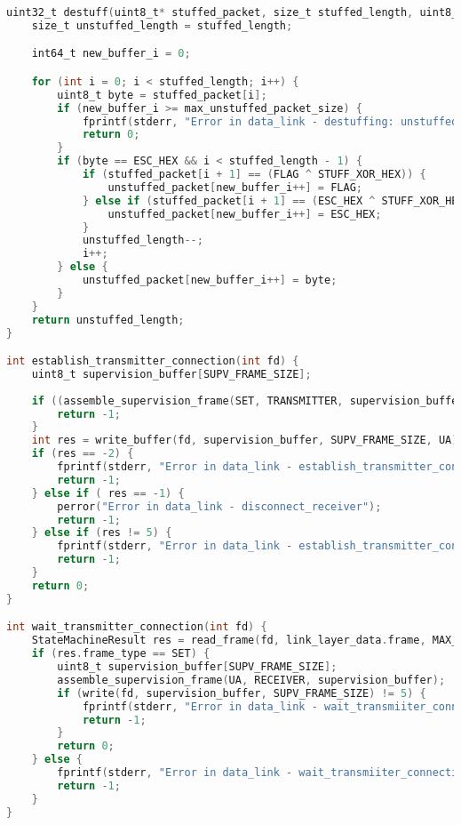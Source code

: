 \begin{lstlisting}[language=C, caption=data_link.c]
uint32_t destuff(uint8_t* stuffed_packet, size_t stuffed_length, uint8_t* unstuffed_packet, size_t max_unstuffed_packet_size) {
    size_t unstuffed_length = stuffed_length;

    int64_t new_buffer_i = 0;

    for (int i = 0; i < stuffed_length; i++) {
        uint8_t byte = stuffed_packet[i];
        if (new_buffer_i >= max_unstuffed_packet_size) {
            fprintf(stderr, "Error in data_link - destuffing: unstuffed packet is bigger than the destiny buffer! Tried to access %ld on a %ld bytes buffer\n", new_buffer_i, max_unstuffed_packet_size);
            return 0;
        }
        if (byte == ESC_HEX && i < stuffed_length - 1) {
            if (stuffed_packet[i + 1] == (FLAG ^ STUFF_XOR_HEX)) {
                unstuffed_packet[new_buffer_i++] = FLAG;
            } else if (stuffed_packet[i + 1] == (ESC_HEX ^ STUFF_XOR_HEX)) {
                unstuffed_packet[new_buffer_i++] = ESC_HEX;
            }
            unstuffed_length--;
            i++;
        } else {
            unstuffed_packet[new_buffer_i++] = byte;
        }
    }
    return unstuffed_length;
}

int establish_transmitter_connection(int fd) {
    uint8_t supervision_buffer[SUPV_FRAME_SIZE];
    
    if ((assemble_supervision_frame(SET, TRANSMITTER, supervision_buffer)) != 0) {
        return -1;
    }
    int res = write_buffer(fd, supervision_buffer, SUPV_FRAME_SIZE, UA);
    if (res == -2) {
        fprintf(stderr, "Error in data_link - establish_transmitter_connection: no. tries exceeded\n");
        return -1;
    } else if ( res == -1) {
        perror("Error in data_link - disconnect_receiver");
        return -1;
    } else if (res != 5) {
        fprintf(stderr, "Error in data_link - establish_transmitter_connection: no. bytes written not matching expected\n");
        return -1;
    }
    return 0;
}

int wait_transmitter_connection(int fd) {
    StateMachineResult res = read_frame(fd, link_layer_data.frame, MAX_FRAME_SIZE);
    if (res.frame_type == SET) {
        uint8_t supervision_buffer[SUPV_FRAME_SIZE];
        assemble_supervision_frame(UA, RECEIVER, supervision_buffer);
        if (write(fd, supervision_buffer, SUPV_FRAME_SIZE) != 5) {
            fprintf(stderr, "Error in data_link - wait_transmiiter_connection: could no write ACK to transmitter\n");
            return -1;
        }
        return 0;
    } else {
        fprintf(stderr, "Error in data_link - wait_transmiiter_connection: received wrong type of frame\n");
        return -1;
    }
}


\end{lstlisting}
